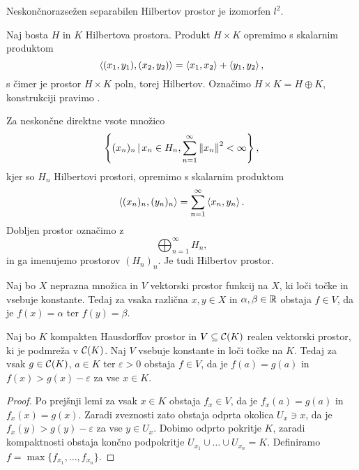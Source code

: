 
\begin{posledica}
  Neskončnorazsežen separabilen Hilbertov prostor je izomorfen $l^2$.
\end{posledica}

Naj bosta $H$ in $K$ Hilbertova prostora.
Produkt $H \times K$ opremimo s skalarnim produktom
\[
  \left< (x_1,y_1), (x_2, y_2) \right> = \left< x_1, x_2 \right> + \left< y_1, y_2 \right>,
\]
s čimer je prostor $H \times K$ poln, torej Hilbertov.
Označimo $H \times K = H \oplus K$, konstrukciji pravimo .

Za neskončne direktne vsote množico
\[
  \left\{ (x_n)_n \,|\, x_n \in H_n, \sum_{n=1}^\infty \left\lVert x_n\right\rVert^2 < \infty
  \right\},
\]
kjer so $H_n$ Hilbertovi prostori, opremimo s skalarnim produktom
\[
  \left< (x_n)_n, (y_n)_n \right> = \sum_{n=1}^\infty \left< x_n, y_n \right>.
\]
Dobljen prostor označimo z
\[
  \bigoplus_{n=1}^\infty H_n,
\]
in ga imenujemo  prostorov $(H_n)_n$.
Je tudi Hilbertov prostor.



\begin{lema}
  Naj bo $X$ neprazna množica in $V$ vektorski prostor funkcij na $X$, ki loči
  točke in vsebuje konstante.
  Tedaj za vsaka različna $x, y \in X$ in $\alpha, \beta \in \mathbb{R}$ obstaja $f \in
  V$, da je $f(x) = \alpha$ ter $f(y) = \beta$.
\end{lema}

\begin{lema}
  Naj bo $K$ kompakten Hausdorffov prostor in $V \subseteq \mathcal{C}(K)$ realen
  vektorski prostor, ki je podmreža v $\mathcal{C}(K)$.
  Naj $V$ vsebuje konstante in loči točke na $K$.
  Tedaj za vsak $g \in \mathcal{C}(K)$, $a \in K$ ter $\varepsilon > 0$ obstaja $f
  \in V$, da je $f(a) = g(a)$ in $f(x) > g(x) - \varepsilon$ za vse $x \in K$.
\end{lema}

\begin{proof}
  Po prejšnji lemi za vsak $x \in K$ obstaja $f_x \in V$, da je $f_x(a) = g(a)$
  in $f_x(x) = g(x)$.
  Zaradi zveznosti zato obstaja odprta okolica $U_x \ni x$, da je $f_x(y) > g(y)
  - \varepsilon$ za vse $y \in U_x$.
  Dobimo odprto pokritje $K$, zaradi kompaktnosti obstaja končno podpokritje
  $U_{x_1} \cup \ldots \cup U_{x_n} = K$.
  Definiramo $f = \max\{f_{x_1}, \ldots, f_{x_n}\}$.
\end{proof}

